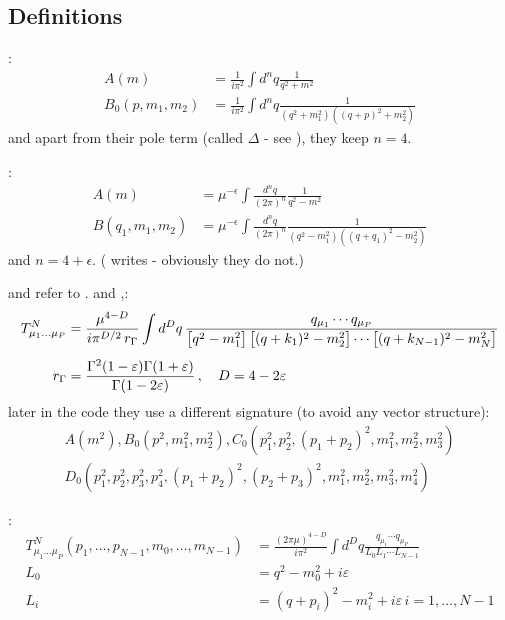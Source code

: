\subsection{Definitions}\label{sec:defs}
\cite{Passarino:1978jh}:
\begin{align}
A(m) &= \frac 1 {i\pi^2}\int d^nq\frac 1 {q^2+m^2}\\
B_0(p,m_1,m_2) &= \frac 1 {i\pi^2}\int d^nq\frac 1 {(q^2+m_1^2)((q+p)^2+m_2^2)}
\end{align}
and apart from their pole term (called $\Delta$ - see \cite[eq. D.1]{Passarino:1978jh}), they keep $n=4$.

\cite{PhysRevD4054,Bojak:2000eu}:
\begin{align}
A(m) &= \mu^{-\epsilon}\int\frac{d^nq}{(2\pi)^n} \frac 1 {q^2-m^2}\\
B(q_1,m_1,m_2) &= \mu^{-\epsilon}\int\frac{d^nq}{(2\pi)^n} \frac 1 {(q^2-m_1^2)((q+q_1)^2-m_2^2)}
\end{align}
and $n=4+\epsilon$. (\cite{PhysRevD4054} writes  - obviously they do not.)

\HEPMath\cite{wiebusch_hepmath_2015} and \FeynCalc\cite{Mertig:1990an,Shtabovenko:2016sxi} refer to \LoopTools\cite{Hahn:1998yk,LoopTools212Guide}. \cite[eq. (1.1)]{LoopTools212Guide} and \cite[eq. (2.6)]{Ellis:2011cr},\QCDLoop\cite{Ellis:2007qk}:
\begin{align}
T_{\mu_1\ldots\mu_P}^N &=
\frac{\mu^{4 - D}}{i\pi^{D/2}\,r_\Gamma}
\int d^Dq\,
\frac{q_{\mu_1}\cdots q_{\mu_P}}
  {\bigl[q^2 - m_1^2\bigr]\,
   \bigl[(q + k_1)^2 - m_2^2\bigr] \cdots
   \bigl[(q + k_{N - 1})^2 - m_N^2\bigr]} \\[1ex]
\notag
r_\Gamma &= \frac{\Gamma^2(1 - \varepsilon)\Gamma(1+\varepsilon)}
  {\Gamma(1 - 2\varepsilon)}\,,
\quad D = 4 - 2\varepsilon\,
\end{align}
later in the code they use a different signature (to avoid any vector structure):
\begin{align}
A(m^2), B_0(p^2,m_1^2,m_2^2), C_0(p_1^2,p_2^2,(p_1+p_2)^2,m_1^2,m_2^2,m_3^2)\nonumber\\
D_0(p_1^2,p_2^2,p_3^2,p_4^2,(p_1+p_2)^2,(p_2+p_3)^2,m_1^2,m_2^2,m_3^2,m_4^2)
\end{align}

\cite{Denner:1991kt}:
\begin{align}
T_{\mu_1\ldots\mu_P}^N(p_1,\ldots,p_{N-1},m_0,\ldots,m_{N-1}) &= \frac{(2\pi\mu)^{4-D}}{i\pi^2}\int d^Dq \frac{q_{\mu_1}\cdots q_{\mu_P}}{L_0 L_1 \cdots L_{N-1}}\\
L_0 &= q^2-m_0^2 +i\varepsilon\\
L_i &= (q+p_i)^2-m_i^2+i\varepsilon \, i=1,\ldots,N-1
\end{align}

